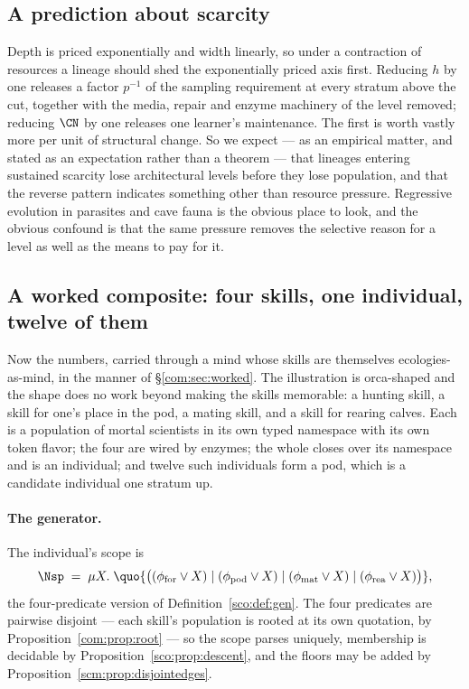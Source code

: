 \subsection{A prediction about scarcity}

\begin{remark}
\label{scm:rmk:shed}
Depth is priced exponentially and width linearly, so under a contraction
of resources a lineage should shed the exponentially priced axis first.
Reducing $h$ by one releases a factor $p^{-1}$ of the sampling requirement
at every stratum above the cut, together with the media, repair and enzyme
machinery of the level removed; reducing $\CN$ by one releases one
learner's maintenance. The first is worth vastly more per unit of
structural change. So we expect --- as an empirical matter, and stated as
an expectation rather than a theorem --- that lineages entering sustained
scarcity lose architectural levels before they lose population, and that
the reverse pattern indicates something other than resource pressure.
Regressive evolution in parasites and cave fauna is the obvious place to
look, and the obvious confound is that the same pressure removes the
selective reason for a level as well as the means to pay for it.
\end{remark}

\subsection{A worked composite: four skills, one individual, twelve of them}
\label{scm:sec:composite}

Now the numbers, carried through a mind whose skills are themselves
ecologies-as-mind, in the manner of \S\ref{com:sec:worked}. The
illustration is orca-shaped and the shape does no work beyond making the
skills memorable: a hunting skill, a skill for one's place in the pod, a
mating skill, and a skill for rearing calves. Each is a population of
mortal scientists in its own typed namespace with its own token flavor;
the four are wired by enzymes; the whole closes over its namespace and is
an individual; and twelve such individuals form a pod, which is a
candidate individual one stratum up.

\paragraph{The generator.}
The individual's scope is
\[
  \Nsp \;=\; \mu X.\;
  \quo{\bigl( (\phi_{\mathrm{for}} \lor X) \mid
              (\phi_{\mathrm{pod}} \lor X) \mid
              (\phi_{\mathrm{mat}} \lor X) \mid
              (\phi_{\mathrm{rea}} \lor X) \bigr)},
\]
the four-predicate version of Definition~\ref{sco:def:gen}. The four
predicates are pairwise disjoint --- each skill's population is rooted at
its own quotation, by Proposition~\ref{com:prop:root} --- so the scope
parses uniquely, membership is decidable by
Proposition~\ref{sco:prop:descent}, and the floors may be added by
Proposition~\ref{scm:prop:disjointedges}.

